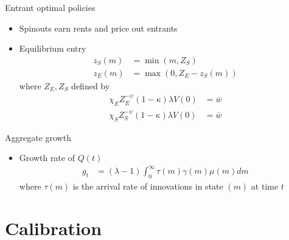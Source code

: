 \documentclass[english,usenames,dvipsnames]{beamer}
\begin{document}
\begin{frame}{Entrant optimal policies}
\begin{itemize}
	\item Spinouts earn rents and price out entrants
	\item Equilibrium entry
	\begin{align*}
	z_S(m) &= \min(m,Z_S) \\
	z_E(m) &= \max(0, Z_E - z_S(m))
	\end{align*} 
	where $Z_E,Z_S$ defined by
	\begin{align*}
	\chi_E Z_E^{-\psi} (1-\kappa) \lambda V(0) &= \bar{w} \\
	\chi_S Z_S^{-\psi} (1-\kappa) \lambda V(0) &= \bar{w} 
	\end{align*}
\end{itemize}
\end{frame}


\begin{frame}{Aggregate growth}
\begin{itemize}
	\item Growth rate of $Q(t)$
	\begin{align*}
	g_t &= (\lambda -1) \int_0^{\infty} \tau(m) \gamma(m) \mu(m) dm
	\end{align*}
	where $\tau(m)$ is the arrival rate of innovations in state $(m)$ at time $t$
\end{itemize}
\end{frame}


\section{Calibration}


\begin{frame}
\tableofcontents[currentsection]
\end{frame}
\end{document}
